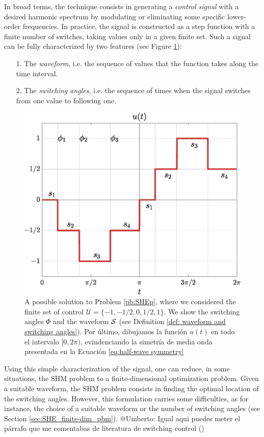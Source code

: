 \documentclass[twocolumn]{autart}    %
\begin{document}
In broad terms, the technique consists in generating a \textit{control signal} with a desired harmonic spectrum by modulating or eliminating some specific lower-order frequencies. In practice, the signal is constructed as a step function with a finite number of switches, taking values only in a given finite set. Such a signal can be fully characterized by two features (see Figure \ref{fig:exampleSHE}): 
\begin{itemize}
	\item[1.] The \textit{waveform}, i.e. the sequence of values that the function takes along the time interval.
	\item[2.] The \textit{switching angles}, i.e. the sequence of times when the signal switches from one value to following one. 
\end{itemize}

\begin{figure}[h]
	\centering
	\includegraphics[scale=0.35]{img/fig01.eps} 
	\caption{A possible solution to Problem \ref{pb:SHEp}, where we considered the finite set of control $\mathcal{U} = \{-1, -1/2, 0, 1/2, 1\}$. We show the switching angles $\Phi$ and the waveform $\mathcal{S}$ (see Definition \ref{def: waveform and switching angles}). Por último, dibujamos la función $u(t)$ en todo el intervalo $[0,2\pi)$, evindenciando la simetría de media onda presentada en la Ecuación \eqref{eq:half-wave symmetry}}
	\label{fig:exampleSHE}
\end{figure}
Using this simple characterization of the signal, one can reduce, in some situations, the SHM problem to a finite-dimensional optimization problem.
Given a suitable waveform, the SHM problem consists in finding the optimal location of the switching angles. However, this formulation carries some difficulties,  as for instance, the choice of a suitable waveform or the number of switching angles (see Section \ref{sec:SHE_finite-dim_pbm}).  
\JOStart
@Umberto: Igual aqui puedes meter el párrafo que me comentabas de literatura de switching control (\cite{Zuazua2011})
\JOEnd
\end{document}
